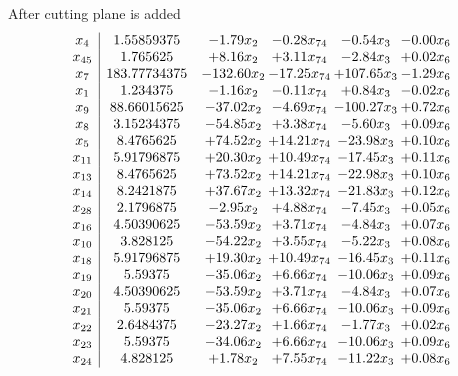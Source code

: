\documentclass[8pt]{article}
\begin{document}
 After cutting plane is added 
\[\begin{array}{c| c c@{\hskip 2pt} c@{\hskip 2pt} c@{\hskip 2pt} c@{\hskip 2pt} }
 x_{4}   &  1.55859375 & -1.79 x_{2} & -0.28 x_{74} & -0.54 x_{3} & -0.00 x_{6}\\
 x_{45}   &  1.765625 & +  8.16 x_{2} & +  3.11 x_{74} & -2.84 x_{3} & +  0.02 x_{6}\\
 x_{7}   &  183.77734375 & -132.60 x_{2} & -17.25 x_{74} & + 107.65 x_{3} & -1.29 x_{6}\\
 x_{1}   &  1.234375 & -1.16 x_{2} & -0.11 x_{74} & +  0.84 x_{3} & -0.02 x_{6}\\
 x_{9}   &  88.66015625 & -37.02 x_{2} & -4.69 x_{74} & -100.27 x_{3} & +  0.72 x_{6}\\
 x_{8}   &  3.15234375 & -54.85 x_{2} & +  3.38 x_{74} & -5.60 x_{3} & +  0.09 x_{6}\\
 x_{5}   &  8.4765625 & + 74.52 x_{2} & + 14.21 x_{74} & -23.98 x_{3} & +  0.10 x_{6}\\
 x_{11}   &  5.91796875 & + 20.30 x_{2} & + 10.49 x_{74} & -17.45 x_{3} & +  0.11 x_{6}\\
 x_{13}   &  8.4765625 & + 73.52 x_{2} & + 14.21 x_{74} & -22.98 x_{3} & +  0.10 x_{6}\\
 x_{14}   &  8.2421875 & + 37.67 x_{2} & + 13.32 x_{74} & -21.83 x_{3} & +  0.12 x_{6}\\
 x_{28}   &  2.1796875 & -2.95 x_{2} & +  4.88 x_{74} & -7.45 x_{3} & +  0.05 x_{6}\\
 x_{16}   &  4.50390625 & -53.59 x_{2} & +  3.71 x_{74} & -4.84 x_{3} & +  0.07 x_{6}\\
 x_{10}   &  3.828125 & -54.22 x_{2} & +  3.55 x_{74} & -5.22 x_{3} & +  0.08 x_{6}\\
 x_{18}   &  5.91796875 & + 19.30 x_{2} & + 10.49 x_{74} & -16.45 x_{3} & +  0.11 x_{6}\\
 x_{19}   &  5.59375 & -35.06 x_{2} & +  6.66 x_{74} & -10.06 x_{3} & +  0.09 x_{6}\\
 x_{20}   &  4.50390625 & -53.59 x_{2} & +  3.71 x_{74} & -4.84 x_{3} & +  0.07 x_{6}\\
 x_{21}   &  5.59375 & -35.06 x_{2} & +  6.66 x_{74} & -10.06 x_{3} & +  0.09 x_{6}\\
 x_{22}   &  2.6484375 & -23.27 x_{2} & +  1.66 x_{74} & -1.77 x_{3} & +  0.02 x_{6}\\
 x_{23}   &  5.59375 & -34.06 x_{2} & +  6.66 x_{74} & -10.06 x_{3} & +  0.09 x_{6}\\
 x_{24}   &  4.828125 & +  1.78 x_{2} & +  7.55 x_{74} & -11.22 x_{3} & +  0.08 x_{6}\\

\end{array}\]
\end{document}
